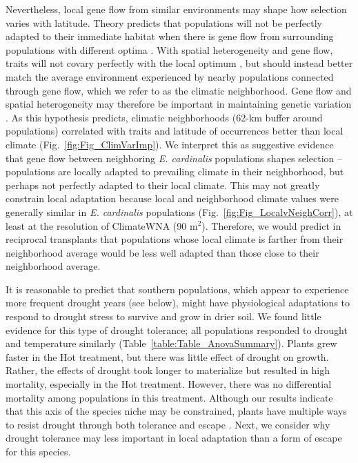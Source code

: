 \documentclass[11pt, oneside]{article}
\begin{document}
Nevertheless, local gene flow from similar environments may shape how selection varies with latitude. Theory predicts that populations will not be perfectly adapted to their immediate habitat when there is gene flow from surrounding populations with different optima \citep{Lenormand_2002}. With spatial heterogeneity and gene flow, traits will not covary perfectly with the local optimum \citep{Slatkin_1978, Paul_etal_2011, Hadfield_2016}, but should instead better match the average environment experienced by nearby populations connected through gene flow, which we refer to as the climatic neighborhood. Gene flow and spatial heterogeneity may therefore be important in maintaining genetic variation \citep{Yeaman_Jarvis_2006}. As this hypothesis predicts, climatic neighborhoods (62-km buffer around populations) correlated with traits and latitude of occurrences better than local climate (Fig.~\ref{fig:Fig_ClimVarImp}). We interpret this as suggestive evidence that gene flow between neighboring \textit{E. cardinalis} populations shapes selection -- populations are locally adapted to prevailing climate in their neighborhood, but perhaps not perfectly adapted to their local climate. This may not greatly constrain local adaptation because local and neighborhood climate values were generally similar in \textit{E. cardinalis} populations (Fig.~\ref{fig:Fig_LocalvNeighCorr}), at least at the resolution of ClimateWNA (90 m$^2$). Therefore, we would predict in reciprocal transplants that populations whose local climate is farther from their neighborhood average would be less well adapted than those close to their neighborhood average.

It is reasonable to predict that southern populations, which appear to experience more frequent drought years (see below), might have physiological adaptations to respond to drought stress to survive and grow in drier soil. We found little evidence for this type of drought tolerance; all populations responded to drought and temperature similarly (Table~\ref{table:Table_AnovaSummary}). Plants grew faster in the Hot treatment, but there was little effect of drought on growth. Rather, the effects of drought took longer to materialize but resulted in high mortality, especially in the Hot treatment. However, there was no differential mortality among populations in this treatment. Although our results indicate that this axis of the species niche may be constrained, plants have multiple ways to resist drought through both tolerance and escape \citep{Ludlow_1989, Kooyers_2015}. Next, we consider why drought tolerance may less important in local adaptation than a form of escape for this species.
\end{document}
